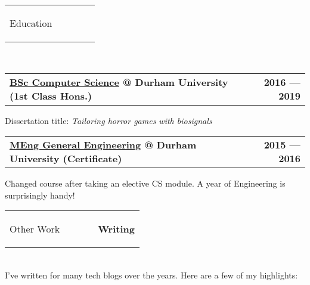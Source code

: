 \documentclass[hidelinks, 12pt, a4paper]{article}
\begin{document}
	\vspace{24pt}
	\begin{tabularx}{\textwidth}{@{}llXrr@{}}
		\begin{Large}Education\end{Large}&
		\rule{80pt}{1pt}&&&
	\end{tabularx}\\
	
	
	\begin{tabularx}{\linewidth}{@{}Xr@{}}
		\textbf{\href{https://www.dur.ac.uk/courses/info/?id=11509\&title=Computer+Science\&code=G400\&type=BSC\&year=2016}{BSc Computer Science} @ Durham University (1st Class Hons.)} & \textbf{2016 --- 2019}
	\end{tabularx}\vspace{2pt}

	Dissertation title: \emph{Tailoring horror games with biosignals}\\

	\begin{tabularx}{\linewidth}{@{}Xr@{}}
		\textbf{\href{https://www.dur.ac.uk/courses/info/?id=11558\&title=General+Engineering\&code=H100\&type=MENG\&year=2015}{MEng General Engineering} @ Durham University (Certificate)} & \textbf{2015 --- 2016}
	\end{tabularx}\vspace{2pt}

	Changed course after taking an elective CS module.
	A year of Engineering is surprisingly handy!
	
	\newpage
	
	\begin{tabularx}{\textwidth}{@{}llXrr@{}}
		\begin{Large}Other Work\end{Large}&
		\rule{80pt}{1pt}&&
		\rule{63pt}{1pt}&
		\textbf{Writing}
	\end{tabularx}\\

	I've written for many tech blogs over the years. Here are a few of my highlights:
\end{document}
